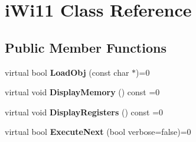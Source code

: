 \hypertarget{classiWi11}{
\section{iWi11 Class Reference}
\label{classiWi11}
}
\subsection*{Public Member Functions}
\begin{DoxyCompactItemize}
\item 
\hypertarget{classiWi11_aa25542f6a447a55a63c1a9892eb0a405}{
virtual bool {\bfseries LoadObj} (const char $\ast$)=0}
\label{classiWi11_aa25542f6a447a55a63c1a9892eb0a405}

\item 
\hypertarget{classiWi11_ad9b13831ad9a83a8abbc3a77794b38bc}{
virtual void {\bfseries DisplayMemory} () const =0}
\label{classiWi11_ad9b13831ad9a83a8abbc3a77794b38bc}

\item 
\hypertarget{classiWi11_a143e669e3c7f46c3d1524838c8d74d94}{
virtual void {\bfseries DisplayRegisters} () const =0}
\label{classiWi11_a143e669e3c7f46c3d1524838c8d74d94}

\item 
\hypertarget{classiWi11_ae502d86eb25fe6e1169e800939362074}{
virtual bool {\bfseries ExecuteNext} (bool verbose=false)=0}
\label{classiWi11_ae502d86eb25fe6e1169e800939362074}

\end{DoxyCompactItemize}
